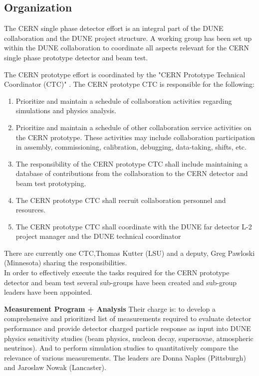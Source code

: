 \subsection{Organization}

The CERN single phase detector effort is an integral part of the DUNE collaboration and the DUNE project structure. 
A working group has been set up within the DUNE collaboration to coordinate all aspects relevant for the CERN single phase prototype detector and beam test. 

The CERN prototype effort is coordinated by the "CERN Prototype Technical Coordinator (CTC)" \cite{LBNEorg}.
The CERN prototype CTC is responsible for the following:
\begin{enumerate}[i]
	\item Prioritize and maintain a schedule of collaboration activities regarding simulations and physics analysis. 
	\item Prioritize and maintain a schedule of other collaboration service activities on the CERN prototype.  These activities may include collaboration participation in assembly, commissioning, calibration, debugging, data-taking, shifts, etc. 
	\item The responsibility of the CERN prototype CTC shall include maintaining a database of contributions from the collaboration to the CERN detector and beam test prototyping.
	\item The CERN prototype CTC shall recruit collaboration personnel and resources.
	\item The CERN prototype CTC shall coordinate with the DUNE far detector L-2 project manager and the DUNE technical coordinator
\end{enumerate}
There are currently one CTC,Thomas Kutter (LSU)  and a deputy, Greg Pawloski (Minnesota) sharing the responsibilities.\\
 

In order to effectively execute the tasks required for the CERN prototype detector and beam test several sub-groups have been created 
and sub-group leaders have been appointed.

{\bf Measurement Program + Analysis}   Their charge is: to develop a comprehensive and prioritized list of measurements required to evaluate detector performance and provide detector charged particle response as input into DUNE physics sensitivity studies (beam physics, nucleon decay, supernovae, atmospheric neutrinos).  And to perform simulation studies to quantitatively compare the relevance of various measurements.
The leaders are Donna Naples (Pittsburgh) and Jaroslaw Nowak (Lancaster).
 
